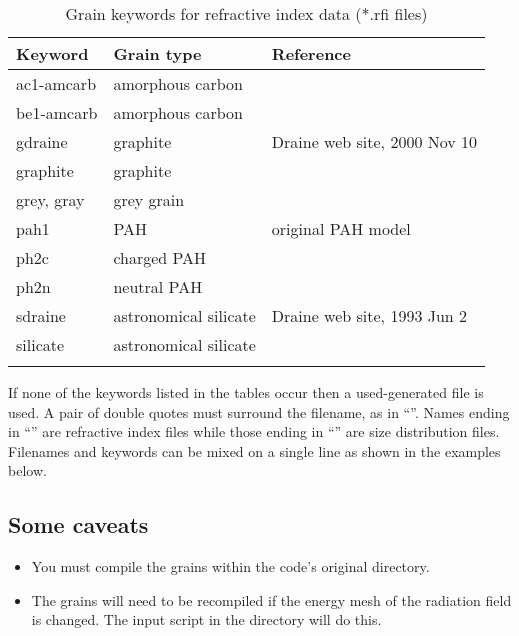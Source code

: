 \begin{table}
\centering
\caption{Grain keywords for refractive index data (*.rfi files)}
\begin{tabular}{lll}
\hline
Keyword& Grain type& Reference\\
\hline
ac1-amcarb            & amorphous carbon   & \citealp{Rouleau1991}\\
be1-amcarb            & amorphous carbon   & \citealp{Rouleau1991}\\
gdraine                    &  graphite                     & Draine web site, 2000 Nov 10    \\
graphite                   & graphite                      & \citealp{Martin1991}   \\
grey, gray                & grey grain                   \\
pah1                         & PAH                             & original PAH model    \\
ph2c                         & charged PAH             & \citealp{Li2001}       \\
ph2n                         & neutral PAH               & \citealp{Li2001}       \\
sdraine                     & astronomical silicate &  Draine web site, 1993 Jun 2   \\
silicate                      & astronomical silicate & \citealp{Martin1991}\\
\hline
\label{tab:GrainRefractiveIndexKeywords}
\end{tabular}
\end{table}

  If none of the keywords
listed in the tables
occur then a used-generated file is used.
A pair of double quotes must
surround the filename, as in ``''.
Names ending in
``'' are
refractive index files while those ending in ``''
are size distribution files.
Filenames and keywords can be mixed on a single line as shown in
the examples below.

\subsection{Some caveats}

\begin{itemize}

\item
You must compile the grains within the code's original  directory.

\item
The grains will need to be recompiled if the energy mesh of the radiation
field is changed. 
The input script  in the   
directory will do this.

\end{itemize}

